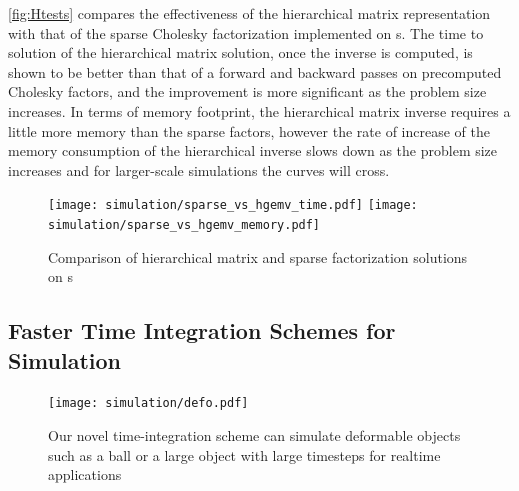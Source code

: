 
\autoref{fig:Htests} compares the effectiveness of the hierarchical matrix representation with that of the sparse Cholesky factorization implemented on s. The time to solution of the hierarchical matrix solution, once the inverse is computed, is shown to be better than that of a forward and backward passes on precomputed Cholesky factors, and the improvement is more significant as the problem size increases. In terms of memory footprint, the hierarchical matrix inverse requires a little more memory than the sparse factors, however the rate of increase of the memory consumption of the hierarchical inverse slows down as the problem size increases and for larger-scale simulations the curves will cross.

\begin{figure}
  \centering%
  \texttt{[image: simulation/sparse\_vs\_hgemv\_time.pdf]}
  \qquad\qquad%
  \texttt{[image: simulation/sparse\_vs\_hgemv\_memory.pdf]}
  \caption{Comparison of hierarchical matrix and sparse factorization solutions on s}
  \label{fig:Htests}
\end{figure}


\subsection{Faster Time Integration Schemes for Simulation}
\begin{figure}[ht]
  \centering
  \texttt{[image: simulation/defo.pdf]}
  \caption{Our novel time-integration scheme  can simulate deformable objects such as a ball or a large object with large timesteps for realtime applications}
  \label{fig:pbdd}
\end{figure}

